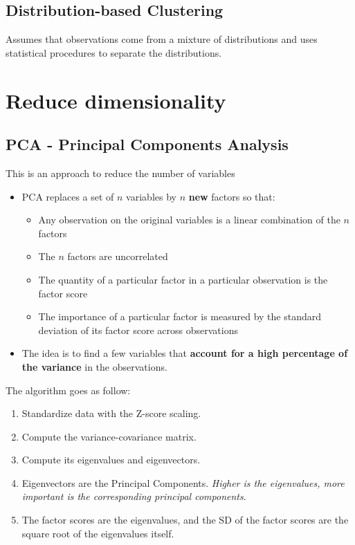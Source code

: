 \subsection{Distribution-based Clustering}

Assumes that observations come from a mixture of distributions and uses statistical procedures to separate the distributions.
\section{Reduce dimensionality}
\subsection{PCA - Principal Components Analysis}

This is an approach to reduce the number of variables
\begin{itemize}
    \item PCA replaces a set of $n$ variables by $n$ \textbf{new} factors so that:
          \begin{itemize}
              \item Any observation on the original variables is a linear combination of the $n$ factors
              \item The $n$ factors are uncorrelated
              \item The quantity of a particular factor in a particular observation is the factor score
              \item The importance of a particular factor is measured by the standard deviation of its factor score across observations \ 
          \end{itemize}
    \item The idea is to find a few variables that \textbf{account for a high percentage of the variance} in the observations.
\end{itemize}

The algorithm goes as follow:
\begin{enumerate}
    \item Standardize data with the Z-score scaling.
    \item Compute the variance-covariance matrix.
    \item Compute its eigenvalues and eigenvectors.
    \item Eigenvectors are the Principal Components. \textit{Higher is the eigenvalues, more important is the corresponding principal components}.
    \item The factor scores are the eigenvalues, and the SD of the factor scores are the square root of the eigenvalues itself.
\end{enumerate}

